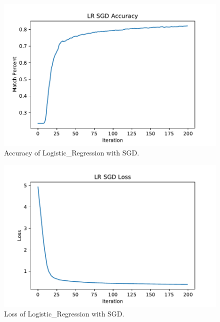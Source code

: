 \documentclass[journal, a4paper]{IEEEtran}
\begin{document}
	\begin{figure}[!hbt]
		\begin{center}
		\includegraphics[width=\columnwidth]{lab2_lr_sgd_acc}
		\caption{Accuracy of Logistic\_Regression with SGD.}
		\end{center}
	\end{figure}
	\begin{figure}[!hbt]
		\begin{center}
		\includegraphics[width=\columnwidth]{lab2_lr_sgd_loss}
		\caption{Loss of Logistic\_Regression with SGD.}
		\end{center}
	\end{figure}
	
\end{document}
